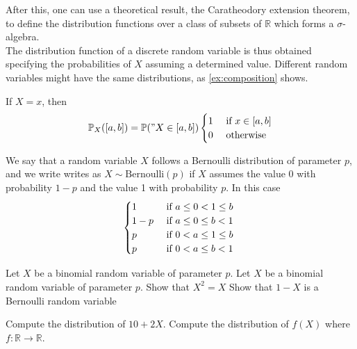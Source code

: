 After this, one can use a theoretical result, the Caratheodory extension theorem, to define the distribution functions over a class of subsets of $\mathbb R$ which forms a $\sigma$-algebra. \\
The distribution function of a discrete random variable is thus obtained specifying the probabilities of $X$ assuming a determined value. Different random variables might have the same distributions, as \ref{ex:composition} shows. 

\begin{example}
    If $X = x$, then 
    \begin{equation}
        \mathbb P_X ([a,b]) = \mathbb P(" X \in [a,b])\begin{cases}
            1 & \textrm{ if $x \in [a,b]$}\\
            0 & \textrm{ otherwise}
        \end{cases}
    \end{equation}
\end{example}

\begin{example}
 We say that a random variable $X$ follows a Bernoulli distribution of parameter $p$, and we write writes as $X \sim \textrm{Bernoulli}(p)$ if $X$ assumes the value 0 with probability $1-p$ and the value 1 with  probability $p$. In this case 
 \begin{equation}
 \label{e:bernoulli}
        \begin{cases}
        1 & \textrm{ if $a \leq 0 < 1 \leq b$ } \\
        1-p & \textrm{ if $ a \leq 0 \leq b < 1 $}\\
        p & \textrm{ if $   0 < a \leq 1 \leq b $}\\
        p & \textrm{ if $   0 < a \leq b < 1$}
        \end{cases}
 \end{equation}
\end{example}


\begin{ExerciseList}

    \Exercise Let $X$ be a binomial random variable of parameter $p$. 
    \Exercise Let $X$ be a binomial random variable of parameter $p$. 
        \Question Show that $X^2 = X $
        \Question Show that $1- X$ is a Bernoulli random variable

        \Question Compute the distribution of $10 + 2X$.
        \Question Compute the distribution of $f(X)$ where $f: \mathbb R \to \mathbb R$.
    
\end{ExerciseList}

